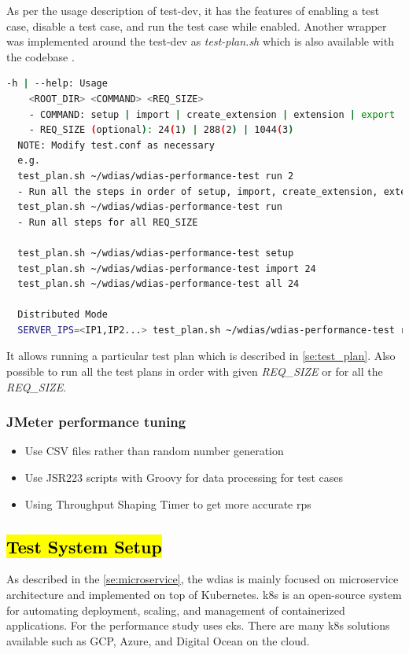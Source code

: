 As per the usage description of test-dev, it has the features of enabling a test case, disable a test case, and run the test case while enabled.
Another wrapper was implemented around the test-dev as \emph{test-plan.sh} which is also available with the codebase \cite{KarunarathneWdias-performance-test/TEST_PLAN.md:Plan}.

\begin{lstlisting}[language=sh, caption=Test Plan Help]
-h | --help: Usage
    <ROOT_DIR> <COMMAND> <REQ_SIZE>
    - COMMAND: setup | import | create_extension | extension | export | all | query
    - REQ_SIZE (optional): 24(1) | 288(2) | 1044(3)
  NOTE: Modify test.conf as necessary
  e.g.
  test_plan.sh ~/wdias/wdias-performance-test run 2
  - Run all the steps in order of setup, import, create_extension, extension, export, all, query
  test_plan.sh ~/wdias/wdias-performance-test run
  - Run all steps for all REQ_SIZE

  test_plan.sh ~/wdias/wdias-performance-test setup
  test_plan.sh ~/wdias/wdias-performance-test import 24
  test_plan.sh ~/wdias/wdias-performance-test all 24

  Distributed Mode
  SERVER_IPS=<IP1,IP2...> test_plan.sh ~/wdias/wdias-performance-test run
\end{lstlisting}

It allows running a particular test plan which is described in \cref{se:test_plan}. Also possible to run all the test plans in order with given \emph{REQ\_SIZE} or for all the \emph{REQ\_SIZE}.

\subsubsection{JMeter performance tuning}
\begin{itemize}
    \item Use CSV files rather than random number generation
    \item Use JSR223 scripts with Groovy for data processing for test cases
    \item Using Throughput Shaping Timer to get more accurate \acrshort{rps}
\end{itemize}


\subsection{\hl{Test System Setup}}
\label{subse:test_sys_config}
As described in the \cref{se:microservice}, the \acrshort{wdias} is mainly focused on microservice architecture and implemented on top of Kubernetes. \acrfull{k8s} is an open-source system for automating deployment, scaling, and management of containerized applications. For the performance study uses \acrfull{eks}. There are many \acrshort{k8s} solutions available such as GCP, Azure, and Digital Ocean on the cloud.

